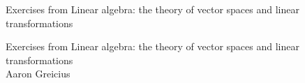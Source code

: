 \documentclass[oneside,10pt,]{book}
\newcommand{\titlepagefont}{\relax}
\numberwithin{equation}{section}
\begin{document}
\frontmatter
\thispagestyle{empty}
{\titlepagefont\centering
\vspace*{0.28\textheight}
{\Huge Exercises from Linear algebra: the theory of vector spaces and linear transformations}\\}
\clearpage
\thispagestyle{empty}
{\titlepagefont\centering
\vspace*{0.14\textheight}
{\Huge Exercises from Linear algebra: the theory of vector spaces and linear transformations}\\[3\baselineskip]
{\Large Aaron Greicius}\\}
\clearpage
\thispagestyle{empty}
\null\clearpage
\setcounter{tocdepth}{1}
\renewcommand*\contentsname{Contents}
\tableofcontents
\mainmatter
%
%
\typeout{************************************************}
\typeout{************************************************}
%
\end{document}
